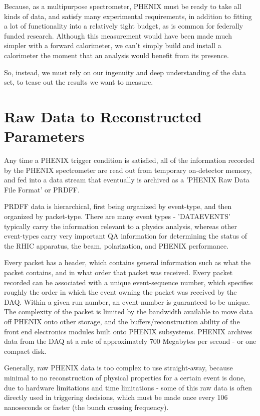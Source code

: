 Because, as a multipurpose spectrometer, PHENIX must be ready to take
all kinds of data, and satisfy many experimental requirements, in addition to
fitting a lot of functionality into a relatively tight budget, as is common for
federally funded research. Although this measurement would have been made
much simpler with a forward calorimeter, we can't simply build and install a
calorimeter the moment that an analysis would benefit from its presence.

So, instead, we must rely on our ingenuity and deep understanding of the data
set, to tease out the results we want to measure.

\section{Raw Data to Reconstructed Parameters}

Any time a PHENIX trigger condition is satisfied, all of the information
recorded by the PHENIX spectrometer are read out from temporary on-detector
memory, and fed into a data stream that eventually is archived as a 'PHENIX Raw
Data File Format' or PRDFF. 

PRDFF data is hierarchical, first being organized by event-type, and
then organized by packet-type.  There are many event types - 'DATAEVENTS'
typically carry the information relevant to a physics analysis, whereas other
event-types carry very important QA information for determining the status of
the RHIC apparatus, the beam, polarization, and PHENIX performance.

Every packet has a header, which contains general information such as what the
packet contains, and in what order that packet was received. Every packet
recorded can be associated with a unique event-sequence number, which specifies
roughly the order in which the event owning the packet was received by the DAQ.
Within a given run number, an event-number is guaranteed to be unique. The
complexity of the packet is limited by the bandwidth available to move data off
PHENIX onto other storage, and the buffers/reconstruction ability of the front
end electronics modules built onto PHENIX subsystems. PHENIX archives data from
the DAQ at a rate of approximately 700 Megabytes per second - or one compact
disk.

Generally, raw PHENIX data is too complex to use straight-away, because minimal
to no reconstruction of physical properties for a certain event is done, due to
hardware limitations and time limitations - some of this raw data is often
directly used in triggering decisions, which must be made once every 106
nanoseconds or faster (the bunch crossing frequency).

